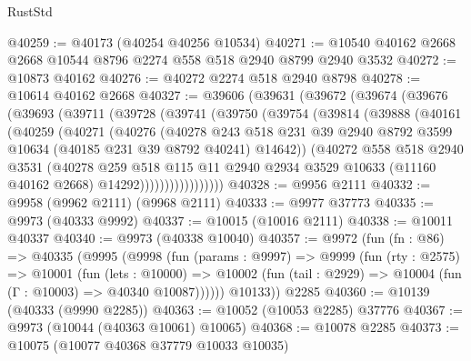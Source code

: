 \begin{lexlean}{RustStd}
\begin{coremodule}
@40259 := @40173 (@40254 @40256 @10534)
@40271 := @10540 @40162 @2668 @2668 @10544 @8796 @2274 @558 @518 @2940 @8799 @2940 @3532
@40272 := @10873 @40162
@40276 := @40272 @2274 @518 @2940 @8798
@40278 := @10614 @40162 @2668
@40327 := @39606
    (@39631
      (@39672
        (@39674
          (@39676
            (@39693
              (@39711
                (@39728
                  (@39741
                    (@39750
                      (@39754
                        (@39814
                          (@39888
                            (@40161
                              (@40259
                                (@40271
                                  (@40276
                                    (@40278
                                      @243
                                      @518
                                      @231
                                      @39
                                      @2940
                                      @8792
                                      @3599
                                      @10634
                                      (@40185 @231 @39 @8792 @40241)
                                      @14642))
                                  (@40272
                                    @558
                                    @518
                                    @2940
                                    @3531
                                    (@40278
                                      @259
                                      @518
                                      @115
                                      @11
                                      @2940
                                      @2934
                                      @3529
                                      @10633
                                      (@11160 @40162 @2668)
                                      @14292)))))))))))))))))
@40328 := @9956 @2111
@40332 := @9958 (@9962 @2111) (@9968 @2111)
@40333 := @9977 @37773
@40335 := @9973 (@40333 @9992)
@40337 := @10015 (@10016 @2111)
@40338 := @10011 @40337
@40340 := @9973 (@40338 @10040)
@40357 := @9972
    (fun (fn : @86) =>
    @40335
      (@9995
        (@9998
          (fun (params : @9997) =>
          @9999
            (fun (rty : @2575) =>
            @10001
              (fun (lets : @10000) =>
              @10002 (fun (tail : @2929) => @10004 (fun (Γ : @10003) => @40340 @10087))))))
        @10133))
    @2285
@40360 := @10139 (@40333 (@9990 @2285))
@40363 := @10052 (@10053 @2285) @37776
@40367 := @9973 (@10044 (@40363 @10061) @10065)
@40368 := @10078 @2285
@40373 := @10075 (@10077 @40368 @37779 @10033 @10035)

\end{coremodule}
\end{lexlean}
